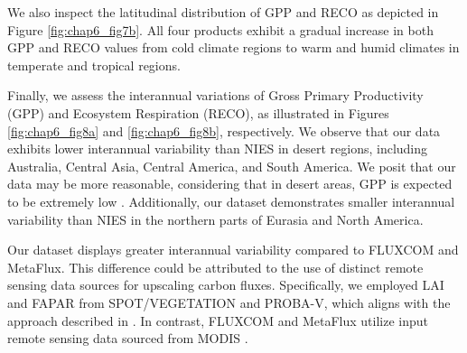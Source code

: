 We also inspect the latitudinal distribution of GPP and RECO as depicted in Figure \ref{fig:chap6_fig7b}. All four products exhibit a gradual increase in both GPP and RECO values from cold climate regions to warm and humid climates in temperate and tropical regions. \par
{}
Finally, we assess the interannual variations of Gross Primary Productivity (GPP) and Ecosystem Respiration (RECO), as illustrated in Figures \ref{fig:chap6_fig8a} and \ref{fig:chap6_fig8b}, respectively. We observe that our data exhibits lower interannual variability than NIES in desert regions, including Australia, Central Asia, Central America, and South America. We posit that our data may be more reasonable, considering that in desert areas, GPP is expected to be extremely low \citep{hadley1981productivity}. Additionally, our dataset demonstrates smaller interannual variability than NIES in the northern parts of Eurasia and North America. \par
Our dataset displays greater interannual variability compared to FLUXCOM and MetaFlux. This difference could be attributed to the use of distinct remote sensing data sources for upscaling carbon fluxes. Specifically, we employed LAI and FAPAR from SPOT/VEGETATION and PROBA-V, which aligns with the approach described in \citep{zeng2020global}. In contrast, FLUXCOM and MetaFlux utilize input remote sensing data sourced from MODIS \citep{jung2019fluxcom, nathaniel2023metaflux}. \par
